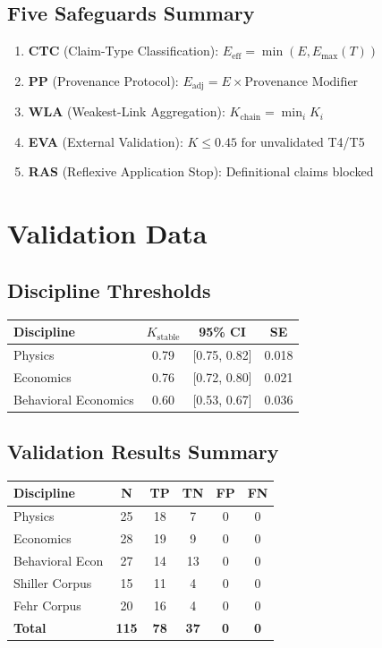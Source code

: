 \documentclass[11pt,a4paper]{article}
\begin{document}
\subsection{Five Safeguards Summary}

\begin{enumerate}
\item \textbf{CTC} (Claim-Type Classification): $E_{\text{eff}} = \min(E, E_{\max}(T))$
\item \textbf{PP} (Provenance Protocol): $E_{\text{adj}} = E \times \text{Provenance Modifier}$
\item \textbf{WLA} (Weakest-Link Aggregation): $K_{\text{chain}} = \min_i K_i$
\item \textbf{EVA} (External Validation): $K \leq 0.45$ for unvalidated T4/T5
\item \textbf{RAS} (Reflexive Application Stop): Definitional claims blocked
\end{enumerate}

\newpage
\section{Validation Data}

\subsection{Discipline Thresholds}

\begin{center}
\begin{tabular}{lccc}
\toprule
\textbf{Discipline} & \textbf{$K_{\text{stable}}$} & \textbf{95\% CI} & \textbf{SE} \\
\midrule
Physics & 0.79 & [0.75, 0.82] & 0.018 \\
Economics & 0.76 & [0.72, 0.80] & 0.021 \\
Behavioral Economics & 0.60 & [0.53, 0.67] & 0.036 \\
\bottomrule
\end{tabular}
\end{center}

\subsection{Validation Results Summary}

\begin{center}
\begin{tabular}{lccccc}
\toprule
\textbf{Discipline} & \textbf{N} & \textbf{TP} & \textbf{TN} & \textbf{FP} & \textbf{FN} \\
\midrule
Physics & 25 & 18 & 7 & 0 & 0 \\
Economics & 28 & 19 & 9 & 0 & 0 \\
Behavioral Econ & 27 & 14 & 13 & 0 & 0 \\
Shiller Corpus & 15 & 11 & 4 & 0 & 0 \\
Fehr Corpus & 20 & 16 & 4 & 0 & 0 \\
\midrule
\textbf{Total} & \textbf{115} & \textbf{78} & \textbf{37} & \textbf{0} & \textbf{0} \\
\bottomrule
\end{tabular}
\end{center}
\end{document}
